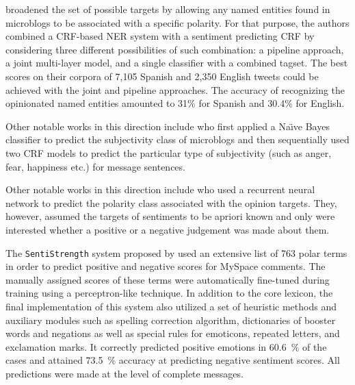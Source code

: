 \citet{Mitchell:13} broadened the set of possible targets by allowing
any named entities found in microblogs to be associated with a
specific polarity.  For that purpose, the authors combined a CRF-based
NER system with a sentiment predicting CRF by considering three
different possibilities of such combination: a pipeline approach, a
joint multi-layer model, and a single classifier with a combined
tagset.  The best scores on their corpora of 7,105 Spanish and 2,350
English tweets could be achieved with the joint and pipeline
approaches.  The accuracy of recognizing the opinionated named
entities amounted to 31\% for Spanish and 30.4\% for English.

Other notable works in this direction include \citet{Chunping:14} who
first applied a Na\"{\i}ve Bayes classifier to predict the
subjectivity class of microblogs and then sequentially used two CRF
models to predict the particular type of subjectivity (such as anger,
fear, happiness etc.) for message sentences.

Other notable works in this direction include \citet{Dong:14} who used
a recurrent neural network to predict the polarity class associated
with the opinion targets.  They, however, assumed the targets of
sentiments to be apriori known and only were interested whether a
positive or a negative judgement was made about them.

\citet{Derks:08}

The \texttt{SentiStrength} system proposed by \cite{Thelwall:12} used
an extensive list of 763 polar terms in order to predict positive and
negative scores for MySpace comments.  The manually assigned scores of
these terms were automatically fine-tuned during training using a
perceptron-like technique.  In addition to the core lexicon, the final
implementation of this system also utilized a set of heuristic methods
and auxiliary modules such as spelling correction algorithm,
dictionaries of booster words and negations as well as special rules
for emoticons, repeated letters, and exclamation marks.  It correctly
predicted positive emotions in 60.6~\% of the cases and attained
73.5~\% accuracy at predicting negative sentiment scores.  All
predictions were made at the level of complete messages.

